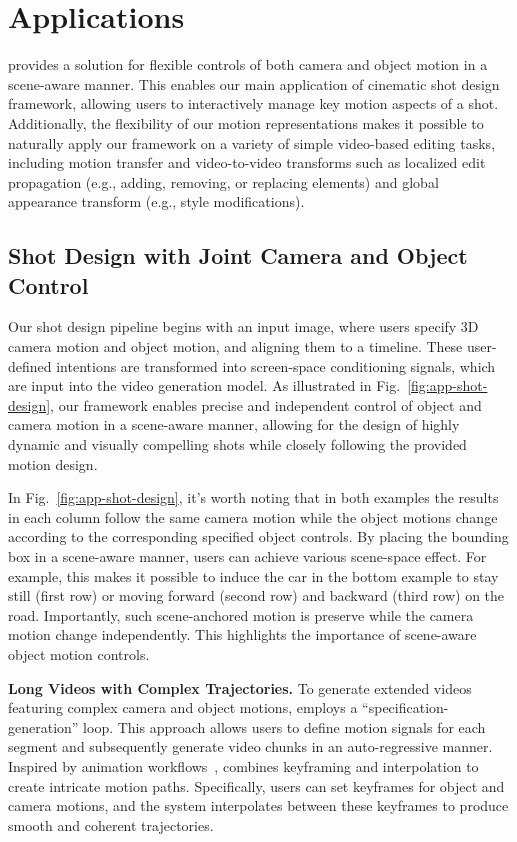 \section{Applications}
\label{sec-4-applications}

\MOCA provides a solution for flexible controls of both camera and object motion in a scene-aware manner. This enables our main application of cinematic shot design framework, allowing users to interactively manage key motion aspects of a shot. 
Additionally, the flexibility of our motion representations makes it possible to naturally apply our framework on a variety of simple video-based editing tasks, including motion transfer and video-to-video transforms such as localized edit propagation (e.g., adding, removing, or replacing elements) and global appearance transform (e.g., style modifications).


\subsection{Shot Design with Joint Camera and Object Control}

Our shot design pipeline begins with an input image, where users specify 3D camera motion and object motion, and aligning them to a timeline. These user-defined intentions are transformed into screen-space conditioning signals, which are input into the video generation model. As illustrated in Fig.~\ref{fig:app-shot-design}, our framework enables precise and independent control of object and camera motion in a scene-aware manner, allowing for the design of highly dynamic and visually compelling shots while closely following the provided motion design. 

In Fig.~\ref{fig:app-shot-design}, it's worth noting that in both examples the results in each column follow the same camera motion while the object motions change according to the corresponding specified object controls. By placing the bounding box in a scene-aware manner, users can achieve various scene-space effect. For example, this makes it possible to induce the car in the bottom example to stay still (first row) or moving forward (second row) and backward (third row) on the road. Importantly, such scene-anchored motion is preserve while the camera motion change independently. This highlights the importance of scene-aware object motion controls.


\textbf{Long Videos with Complex Trajectories.}
To generate extended videos featuring complex camera and object motions, \MOCA employs a ``specification-generation'' loop. This approach allows users to define motion signals for each segment and subsequently generate video chunks in an auto-regressive manner. Inspired by animation workflows~\cite{xing2024tooncrafter,tang2025generativeaicelanimationsurvey}, \MOCA combines keyframing and interpolation to create intricate motion paths. Specifically, users can set keyframes for object and camera motions, and the system interpolates between these keyframes to produce smooth and coherent trajectories. 

